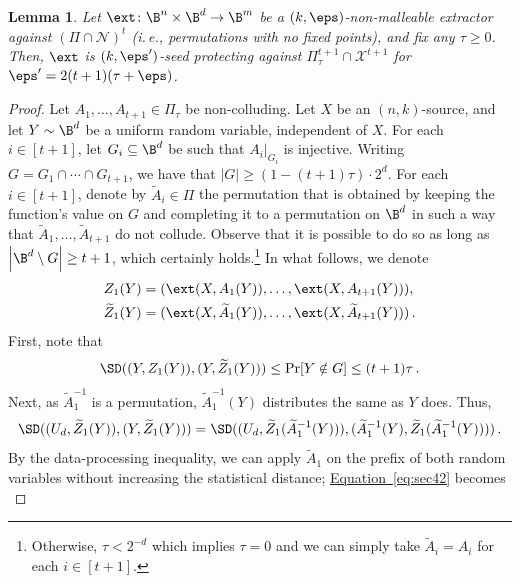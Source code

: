 \documentclass[11pt]{article}
\numberwithin{equation}{section}
\newtheorem{lemma}[theorem]{Lemma}
\theoremstyle{definition}
\theoremstyle{plain}
\newcommand{\ie}{i.\,e.}
\newcommand{\expeqref}[2]{\hyperref[#2]{#1~\eqref{#2}}}
\begin{document}
\begin{lemma}\label{lem:nm-to-sp}
Let $\ext \colon \B^{n} \times \B^{d} \rightarrow \B^{m}$ be a $(k,\eps)$-non-malleable extractor
against $\left( \Pi \cap \mathcal{N} \right)^t$ (\ie, permutations with no fixed points), and fix any $\tau \ge 0$. Then, $\ext$ is $(k,\eps')$-seed protecting against $\Pi^{t+1}_{\tau}  \cap \mathcal{X}^{t+1}$ for
$\eps' = 2(t+1)(\tau+\eps)$.
\end{lemma}
\begin{proof}
Let $A_1,\ldots,A_{t+1} \in \Pi_{\tau}$ be non-colluding. Let $X$ be an $(n,k)$-source, and let $Y \sim \B^{d}$ be 
a uniform random variable, independent of $X$. 
For each $i \in [t+1]$, let $G_i \subseteq \B^{d}$ be such that $A_{i}|_{G_i}$ is injective.
Writing $G = G_{1} \cap \cdots \cap G_{t+1}$, we have that $|G| \ge (1-(t+1)\tau) \cdot 2^{d}$.
%
For each $i \in [t+1]$, denote by $\widetilde{A}_{i} \in \Pi$ the permutation that is obtained by
keeping the function's value on $G$ and completing it to a permutation on $\B^d$ in such a way
that $\widetilde{A}_1,\ldots,\widetilde{A}_{t+1}$ do not collude. Observe that it is possible to do so as long as
$\left|\B^{d} \setminus G\right| \ge t+1$, which certainly holds.\footnote{Otherwise,
$\tau < 2^{-d}$ which implies $\tau = 0$ and we can simply take $\widetilde{A}_i = A_i$
for each $i \in [t+1]$.} 
%
In what follows, we denote
\begin{align*}
Z_1(Y) &= ( \ext(X,A_{1}(Y)),\ldots,\ext(X,A_{t+1}(Y)) ),\\
\widetilde{Z}_1(Y) &= ( \ext(X,\widetilde{A}_{1}(Y)),\ldots,\ext(X,\widetilde{A}_{t+1}(Y)) )\,.
\end{align*}
First, note that
\begin{equation}\label{eq:sec41}
\SD((Y,Z_1(Y)),(Y,\widetilde{Z}_1(Y))) \le \Pr[Y \notin G] \le (t+1)\tau\,.
\end{equation}
Next, as $\widetilde{A}_{1}^{-1}$ is a permutation, $\widetilde{A}_{1}^{-1}(Y)$  distributes the same as $Y$ does. Thus,
\begin{equation}\label{eq:sec42}
\SD((U_d,\widetilde{Z}_1(Y)),(Y,\widetilde{Z}_1(Y))) = 
\SD((U_d,\widetilde{Z}_1(\widetilde{A}_{1}^{-1}(Y))),(\widetilde{A}_{1}^{-1}(Y),\widetilde{Z}_1(\widetilde{A}_{1}^{-1}(Y))))\,.
\end{equation}
By the data-processing inequality,
we can apply $\widetilde{A}_1$ on the prefix of both random variables without increasing
the statistical distance; \expeqref{Equation}{eq:sec42} becomes
\begin{equation}\label{eq:sec423}

\end{equation}
\end{proof}
\end{document}
